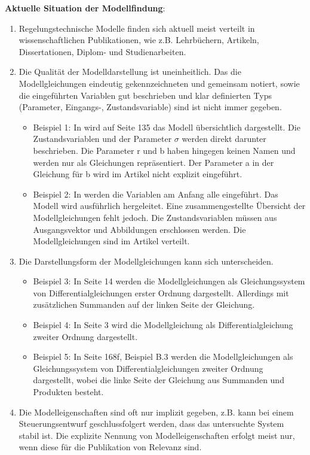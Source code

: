 \textbf{Aktuelle Situation der Modellfindung}: 
\begin{enumerate}
	\item Regelungstechnische Modelle finden sich aktuell meist verteilt in wissenschaftlichen Publikationen, wie z.B. Lehrbüchern, Artikeln, Dissertationen, Diplom- und Studienarbeiten.
	\item Die Qualität der Modelldarstellung ist uneinheitlich. Das die Modellgleichungen eindeutig gekennzeichneten und gemeinsam notiert, sowie die eingeführten Variablen gut beschrieben und klar definierten Typs (Parameter, Eingangs-, Zustandsvariable) sind ist nicht immer gegeben.
	\begin{itemize}[label=$\bullet$]
		\item Beispiel 1: In \cite{LOR63} wird auf Seite 135 das Modell übersichtlich dargestellt. Die Zustandsvariablen und der Parameter $\sigma$ werden direkt darunter beschrieben. Die Parameter r und b haben hingegen keinen Namen und werden nur als Gleichungen repräsentiert. Der Parameter a in der Gleichung für b wird im Artikel nicht explizit eingeführt.
		\item Beispiel 2: In \cite{YIFREA09} werden die Variablen am Anfang alle eingeführt. Das Modell wird ausführlich hergeleitet. Eine zusammengestellte Übersicht der Modellgleichungen fehlt jedoch. Die Zustandsvariablen müssen aus Ausgangsvektor und Abbildungen erschlossen werden. Die Modellgleichungen sind im Artikel verteilt.
	\end{itemize}
	\item Die Darstellungsform der Modellgleichungen kann sich unterscheiden.
	\begin{itemize}[label=$\bullet$]
		\item Beispiel 3: In \cite{SILEEA12} Seite 14 werden die Modellgleichungen als Gleichungssystem von Differentialgleichungen erster Ordnung dargestellt. Allerdings mit zusätzlichen Summanden auf der linken Seite der Gleichung.
		\item Beispiel 4: In \cite{BUT21} Seite 3 wird die Modellgleichung als Differentialgleichung zweiter Ordnung dargestellt.
		\item Beispiel 5: In \cite{KNO16} Seite 168f, Beispiel B.3 werden die Modellgleichungen als Gleichungssystem von Differentialgleichungen zweiter Ordnung dargestellt, wobei die linke Seite der Gleichung aus Summanden und Produkten besteht.
	\end{itemize}
	\item  Die Modelleigenschaften sind oft nur implizit gegeben, z.B. kann bei einem Steuerungsentwurf geschlussfolgert werden, dass das untersuchte System stabil ist. Die explizite Nennung von Modelleigenschaften erfolgt meist nur, wenn diese für die Publikation von Relevanz sind. 

\end{enumerate}
